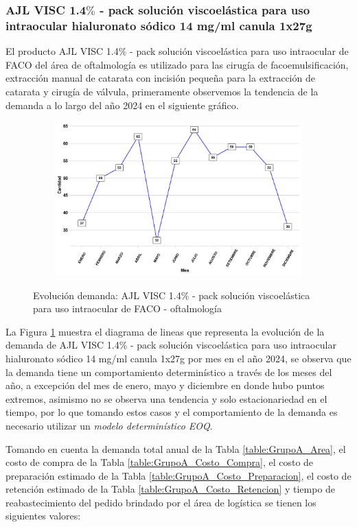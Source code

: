 \subsubsection{AJL VISC 1.4$\%$ - pack solución viscoelástica para uso intraocular hialuronato sódico 14 mg/ml canula 1x27g}

El producto AJL VISC 1.4$\%$ - pack solución viscoelástica para uso intraocular de FACO del área de oftalmología es utilizado para las cirugía de facoemulsificación, extracción manual de catarata con incisión pequeña para la extracción de catarata y cirugía de válvula, primeramente observemos la tendencia de la demanda a lo largo del año 2024 en el siguiente gráfico.

\begin{figure}[H]
  \caption{Evolución demanda: AJL VISC 1.4$\%$ - pack solución viscoelástica para uso intraocular de FACO - oftalmología}
  {\includegraphics[width=15cm, height=5.95cm]{images/PROD005_demanda.pdf}}
  \label{fig:PROD005_demanda}
\end{figure}

La Figura \ref{fig:PROD005_demanda} muestra el diagrama de lineas que representa la evolución de la demanda de AJL VISC 1.4$\%$ - pack solución viscoelástica para uso intraocular hialuronato sódico 14 mg/ml canula 1x27g por mes en el año 2024, se observa que la demanda tiene un comportamiento determinístico a través de los meses del año, a excepción del mes de enero, mayo y diciembre en donde hubo puntos extremos, asimismo no se observa una tendencia y solo estacionariedad en el tiempo, por lo que tomando estos casos y el comportamiento de la demanda es necesario utilizar un \textsl{modelo determinístico EOQ}.

Tomando en cuenta la demanda total anual de la Tabla \ref{table:GrupoA_Area}, el costo de compra de la Tabla \ref{table:GrupoA_Costo_Compra}, el costo de preparación estimado de la Tabla \ref{table:GrupoA_Costo_Preparacion}, el costo de retención estimado de la Tabla \ref{table:GrupoA_Costo_Retencion} y tiempo de reabastecimiento del pedido brindado por el área de logística se tienen los siguientes valores:

